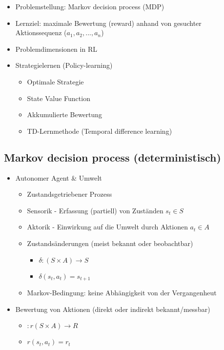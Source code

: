 \documentclass[paper=a4, fontsize=11pt]{scrartcl} %
\numberwithin{equation}{section} %
\numberwithin{figure}{section} %
\numberwithin{table}{section} %
\begin{document}
\begin{itemize}
\item Problemstellung: Markov decision process (MDP)
\item Lernziel: maximale Bewertung (reward) anhand von gesuchter Aktionssequenz ($a_1,a_2,...,a_n$)
\item Problemdimensionen in RL
\item Strategielernen (Policy-learning)
\begin{itemize}
\item Optimale Strategie
\item State Value Function
\item Akkumulierte Bewertung
\item TD-Lernmethode (Temporal difference learning)
\end{itemize}
\end{itemize}

\subsection{Markov decision process (deterministisch)}
\begin{itemize}
\item Autonomer Agent \& Umwelt
\begin{itemize}
\item Zustandsgetriebener Prozess
\item Sensorik - Erfassung (partiell) von Zuständen $s_t \in S$
\item Aktorik - Einwirkung auf die Umwelt durch Aktionen $a_t \in A$
\item Zustandsänderungen (meist bekannt oder beobachtbar)
\begin{itemize}
\item $\delta: (S\times A) \rightarrow S$
\item $\delta(s_t,a_t) = s_{t+1}$
\end{itemize}
\item Markov-Bedingung: keine Abhängigkeit von der Vergangenheut
\end{itemize}
\item Bewertung von Aktionen (direkt oder indirekt bekannt/messbar)
\begin{itemize}
\item $:r(S\times A) \rightarrow R$
\item $r(s_t,a_t) = r_t$
\end{itemize}
\end{itemize}
\end{document}
